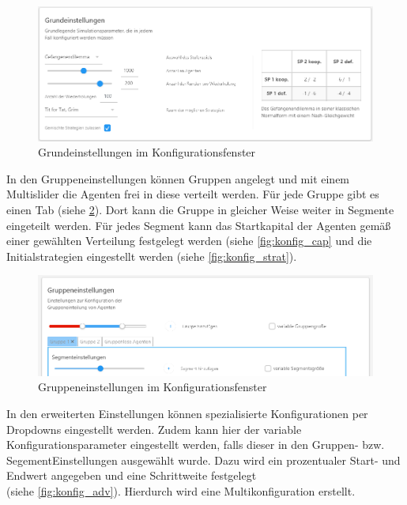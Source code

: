 \documentclass[parskip=full,11pt]{scrartcl}
\begin{document}
\begin{figure}[ht]
	\centering
	\includegraphics[width=\textwidth]{images/konfig_main.png}
	\caption{\label{fig:konfig_main}
		Grundeinstellungen im Konfigurationsfenster}
\end{figure}
\newpage
In den Gruppeneinstellungen können Gruppen angelegt und mit einem Multislider die Agenten frei in diese verteilt werden. Für jede Gruppe gibt es einen Tab (siehe \cref{fig:konfig_group}). Dort kann die Gruppe in gleicher Weise weiter in Segmente eingeteilt werden. Für jedes Segment kann das Startkapital der Agenten gemäß einer gewählten Verteilung festgelegt werden (siehe \cref{fig:konfig_cap} und die Initialstrategien eingestellt werden (siehe \cref{fig:konfig_strat}).



\begin{figure}[ht]
	\centering
	\includegraphics[width=\textwidth]{images/konfig_group.png}
	\caption{\label{fig:konfig_group}
		Gruppeneinstellungen im Konfigurationsfenster}
\end{figure}


In den erweiterten Einstellungen können spezialisierte Konfigurationen per Dropdowns eingestellt werden. Zudem kann hier der variable Konfigurationsparameter eingestellt werden, falls dieser in den Gruppen- bzw. SegementEinstellungen ausgewählt wurde. Dazu wird ein prozentualer Start- und Endwert angegeben und eine Schrittweite festgelegt \\(siehe \cref{fig:konfig_adv}). Hierdurch wird eine Multikonfiguration erstellt.
\end{document}
